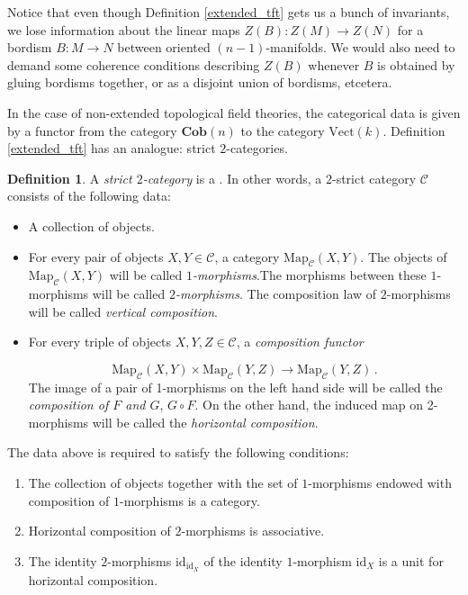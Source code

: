 \documentclass[a4paper,11pt]{article}
\newcommand{\ccal}{\mathcal{C}}
\newcommand{\ide}{\mathrm{id}}
\theoremstyle{plain}
\theoremstyle{definition}
\newtheorem{defi}[thm]{Definition}
\theoremstyle{remark}
\begin{document}
Notice that even though Definition \ref{extended_tft} gets us a bunch of invariants, we lose information about the linear maps $Z(B) \colon Z(M) \to Z(N)$ for a bordism $B \colon M \to N$ between oriented $(n-1)$-manifolds. We would also need to demand some coherence conditions describing $Z(B)$ whenever $B$ is obtained by gluing bordisms together, or as a disjoint union of bordisms, etcetera. 


In the case of non-extended topological field theories, the categorical data is given by a functor from the category $\textbf{Cob}(n)$ to the category $\text{Vect}(k)$. Definition \ref{extended_tft} has an analogue: strict $2$-categories. 


\begin{defi}
\label{strict_2_category}
A \textit{strict $2$-category} is a . In other words, a $2$-strict category $\ccal$ consists of the following data: 
\begin{itemize}
    \item A collection of objects. 
    \item For every pair of objects $X, Y \in \ccal$, a category $\text{Map}_{\ccal}(X,Y)$. The objects of $\text{Map}_{\ccal}(X,Y)$ will be called \textit{$1$-morphisms}.The morphisms between these $1$-morphisms will be called \textit{$2$-morphisms}. The composition law of $2$-morphisms will be called \textit{vertical composition}. 
    \item For every triple of objects $X, Y, Z \in \ccal$, a \textit{composition functor}
    
    $$\text{Map}_{\ccal}(X,Y) \times \text{Map}_{\ccal}(Y,Z) \to \text{Map}_{\ccal}(Y,Z) \, .$$
    The image of a pair of 1-morphisms on the left hand side will be called the \textit{composition of $F$ and $G$}, $G \circ F$. On the other hand, the induced map on 2-morphisms will be called the \textit{horizontal composition}. 
\end{itemize}
The data above is required to satisfy the following conditions:
\begin{enumerate}[label = \arabic*)]
    \item The collection of objects together with the set of $1$-morphisms endowed with composition of $1$-morphisms is a category. 
    \item Horizontal composition of $2$-morphisms is associative. 
    \item The identity $2$-morphisms $\ide_{\ide_X}$ of the identity $1$-morphism $\ide_X$ is a unit for horizontal composition. 
\end{enumerate}
\end{defi}
\end{document}
